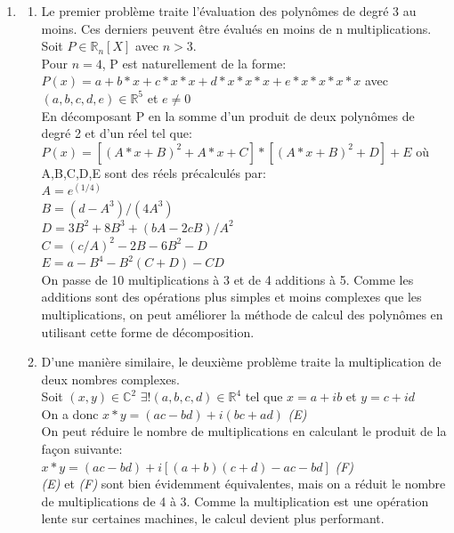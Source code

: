 \documentclass{article}
\begin{document}
\begin{enumerate}
    \vspace{1em}
    \item
        \begin{enumerate}
            \item 
            Le premier problème traite l'évaluation des polynômes de degré 3 au moins. Ces derniers peuvent être évalués en moins de n multiplications. Soit $P \in \mathbb{R}_n[X]$ avec $n > 3$.
            \\Pour $n = 4$, P est naturellement de la forme: 
            \\$P(x) = a + b*x + c*x*x + d*x*x*x + e*x*x*x*x$ avec $(a,b,c,d,e) \in \mathbb{R}^5$ et $e \ne 0$
            \\En décomposant P en la somme d'un produit de deux polynômes de degré 2 et d'un réel tel que:
            \\$P(x) = [(A*x + B)^2 + A*x + C] * [(A*x + B)^2 + D] + E$
            où A,B,C,D,E sont des réels précalculés par: 
            \\$A=e^{(1/4)}$
            \\$B=(d-A^3)/(4A^3)$
            \\$D=3B^2+8B^3+(bA-2cB)/A^2$
            \\$C=(c/A)^2-2B-6B^2-D$
            \\$E=a-B^4-B^2(C+D)-CD$
            \\On passe de 10 multiplications à 3 et de 4 additions à 5. Comme les additions sont des opérations plus simples et moins complexes que les multiplications, on peut améliorer la méthode de calcul des polynômes en utilisant cette forme de décomposition.
            \item 
            D'une manière similaire, le deuxième problème traite la multiplication de deux nombres complexes.
            \\Soit $(x,y) \in \mathbb{C}^2$ $\exists!(a,b,c,d) \in \mathbb{R}^4$ tel que $x=a+ib$ et $y=c+id$
            \\On a donc $x*y=(ac-bd)+i(bc+ad)$ \textit{(E)}
            \\On peut réduire le nombre de multiplications en calculant le produit de la façon suivante:
            \\$x*y=(ac-bd)+i[(a+b)(c+d)-ac-bd]$ \textit{(F)}
            \\\textit{(E)} et \textit{(F)} sont bien évidemment équivalentes, mais on a réduit le nombre de multiplications de 4 à 3. Comme la multiplication est une opération lente sur certaines machines, le calcul devient plus performant.

\end{enumerate}
\end{enumerate}
\end{document}
